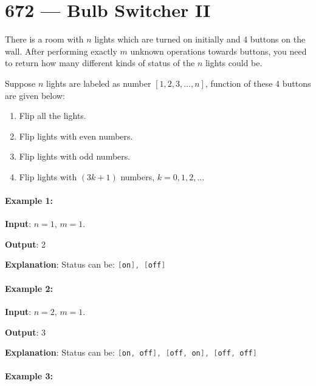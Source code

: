 \section{672 --- Bulb Switcher II}
There is a room with $n$ lights which are turned on initially and 4 buttons on the wall. After performing exactly $m$ unknown operations towards buttons, you need to return how many different kinds of status of the $n$ lights could be.

Suppose $n$ lights are labeled as number $[1, 2, 3, \ldots, n]$, function of these 4 buttons are given below:

\begin{enumerate}
\item Flip all the lights.
\item Flip lights with even numbers.
\item Flip lights with odd numbers.
\item Flip lights with $(3k + 1)$ numbers, $k = 0, 1, 2, \ldots$

\end{enumerate}
 

\paragraph{Example 1:}
\begin{flushleft}

\textbf{Input}: $n = 1$, $m = 1$.

\textbf{Output}: 2

\textbf{Explanation}: Status can be: \lstinline[language=Java, basicstyle=\small\ttfamily, keywordstyle=\bfseries\color{green!40!black}]|[on], [off]|
\end{flushleft}
 

\paragraph{Example 2:}
\begin{flushleft}

\textbf{Input}: $n = 2$, $m = 1$.

\textbf{Output}: 3

\textbf{Explanation}: Status can be: \lstinline[language=Java, basicstyle=\small\ttfamily, keywordstyle=\bfseries\color{green!40!black}]|[on, off], [off, on], [off, off]|
\end{flushleft}
 

\paragraph{Example 3:}

